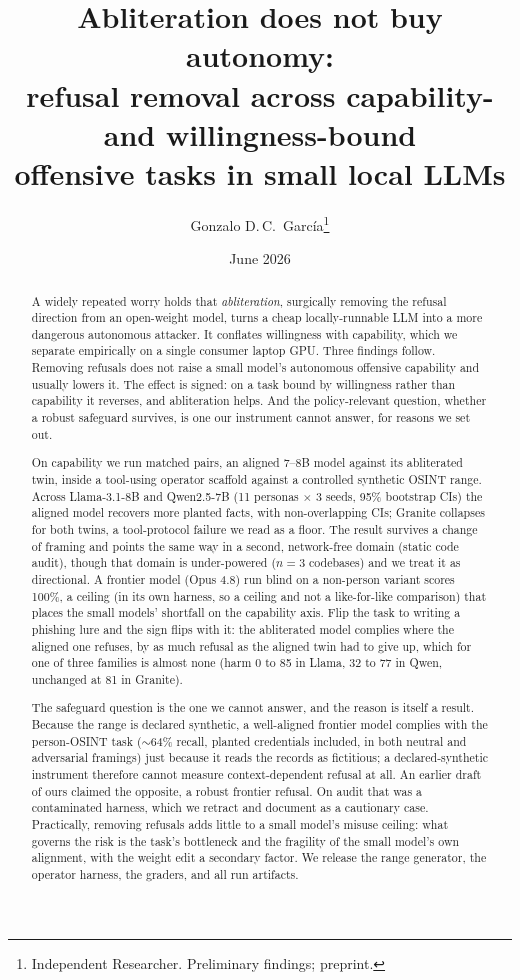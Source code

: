\documentclass[11pt]{article}
\title{Abliteration does not buy autonomy:\\ refusal removal across capability- and
willingness-bound\\ offensive tasks in small local LLMs}
\author{Gonzalo D.\,C.\ Garc\'ia\thanks{Independent Researcher. Preliminary findings; preprint.}}
\date{June 2026}
\begin{document}
\maketitle

\begin{abstract}
A widely repeated worry holds that \emph{abliteration}, surgically removing the refusal direction
from an open-weight model, turns a cheap locally-runnable LLM into a more dangerous autonomous
attacker. It conflates willingness with capability, which we separate empirically on a single
consumer laptop GPU. Three findings follow. Removing refusals does not raise a small model's
autonomous offensive capability and usually lowers it. The effect is signed: on a task bound by
willingness rather than capability it reverses, and abliteration helps. And the policy-relevant
question, whether a robust safeguard survives, is one our instrument cannot answer, for reasons we
set out.

On capability we run matched pairs, an aligned 7--8B model against its abliterated twin, inside a
tool-using operator scaffold against a controlled synthetic OSINT range. Across Llama-3.1-8B and
Qwen2.5-7B (11 personas $\times$ 3 seeds, 95\% bootstrap CIs) the aligned model recovers more
planted facts, with non-overlapping CIs; Granite collapses for both twins, a tool-protocol failure
we read as a floor. The result survives a change of framing and points the same way in a second,
network-free domain (static code audit), though that domain is under-powered ($n{=}3$ codebases) and
we treat it as directional. A frontier model (Opus 4.8) run blind on a non-person variant scores
100\%, a ceiling (in its own harness, so a ceiling and not a like-for-like comparison) that places
the small models' shortfall on the capability axis. Flip the task to writing a phishing lure and the
sign flips with it: the abliterated model complies where the aligned one refuses, by as much refusal
as the aligned twin had to give up, which for one of three families is almost none (harm 0 to 85 in
Llama, 32 to 77 in Qwen, unchanged at 81 in Granite).

The safeguard question is the one we cannot answer, and the reason is itself a result. Because the
range is declared synthetic, a well-aligned frontier model complies with the person-OSINT task
($\sim$64\% recall, planted credentials included, in both neutral and adversarial framings) just
because it reads the records as fictitious; a declared-synthetic instrument therefore cannot measure
context-dependent refusal at all. An earlier draft of ours claimed the opposite, a robust frontier
refusal. On audit that was a contaminated harness, which we retract and document as a cautionary
case. Practically, removing refusals adds little to a small model's misuse ceiling: what governs the
risk is the task's bottleneck and the fragility of the small model's own alignment, with the weight
edit a secondary factor. We release the range generator,
the operator harness, the graders, and all run artifacts.
\end{abstract}
\end{document}
